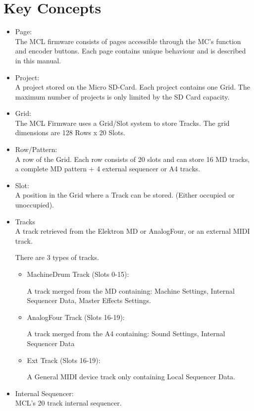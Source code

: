 \chapter{Key Concepts}

\begin{itemize}
\item Page:
\\
The MCL firmware consists of pages accessible through the MC's function and encoder buttons. Each page contains unique behaviour and is described in this manual.
\item Project:
\\
A project stored on the Micro SD-Card. Each project contains one Grid. 
The maximum number of projects is only limited by the SD Card capacity.

\item Grid:
\\
The MCL Firmware uses a Grid/Slot system to store Tracks. 
The grid dimensions are 128 Rows x 20 Slots. 

\item Row/Pattern:
\\
A row of the Grid. Each row consists of 20 slots and can store 16 MD tracks, a complete MD pattern + 4 external sequencer or A4 tracks.

\item Slot:
\\
A position in the Grid where a Track can be stored. (Either occupied or unoccupied).

\item Tracks
\\
A track retrieved from the Elektron MD or AnalogFour, or an external MIDI track.

There are 3 types of tracks.
\begin{itemize}

\item MachineDrum Track (Slots 0-15):

A track merged from the MD containing: Machine Settings, Internal Sequencer Data, Master Effects Settings.
\item AnalogFour Track (Slots 16-19):

A track merged from the A4 containing: Sound Settings, Internal Sequencer Data
\item Ext Track (Slots 16-19):

A General MIDI device track only containing Local Sequencer Data.
\end{itemize}

\item Internal Sequencer:\\
MCL's 20 track internal sequencer.

\end{itemize}


